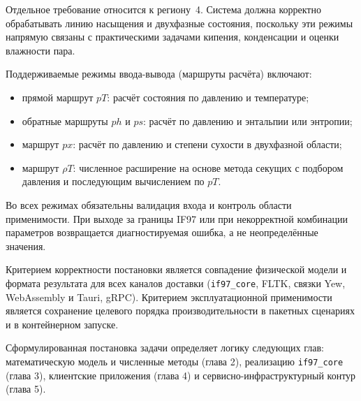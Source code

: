 Отдельное требование относится к региону~4.
Система должна корректно обрабатывать линию насыщения и двухфазные состояния,
поскольку эти режимы напрямую связаны с практическими задачами кипения,
конденсации и оценки влажности пара.

Поддерживаемые режимы ввода-вывода (маршруты расчёта) включают:
\begin{itemize}
\item прямой маршрут $pT$: расчёт состояния по давлению и температуре;
\item обратные маршруты $ph$ и $ps$: расчёт по давлению и энтальпии или энтропии;
\item маршрут $px$: расчёт по давлению и степени сухости в двухфазной области;
\item маршрут $\rho T$: численное расширение на основе метода секущих
с подбором давления и последующим вычислением по $pT$.
\end{itemize}

Во всех режимах обязательны валидация входа и контроль области применимости.
При выходе за границы IF97 или при некорректной комбинации параметров
возвращается диагностируемая ошибка, а не неопределённые значения.

Критерием корректности постановки является
совпадение физической модели и формата результата
для всех каналов доставки
(\texttt{if97\_core}, FLTK,
связки Yew, WebAssembly и Tauri,
gRPC).
Критерием эксплуатационной применимости является
сохранение целевого порядка производительности
в пакетных сценариях и в контейнерном запуске.

Сформулированная постановка задачи определяет логику следующих глав:
математическую модель и численные методы (глава 2),
реализацию \texttt{if97\_core} (глава 3),
клиентские приложения (глава 4)
и сервисно-инфраструктурный контур (глава 5).
